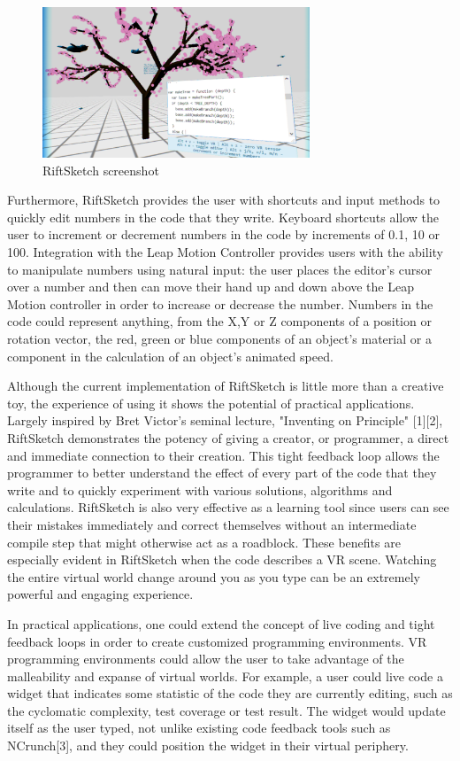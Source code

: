 \documentclass{acm_proc_article-sp}
\begin{document}
\begin{figure}[ht!]
\centering
\includegraphics[width=80mm]{figures/riftsketch/closer}
\caption{RiftSketch screenshot \label{riftsketch}}
\end{figure}

Furthermore, RiftSketch provides the user with shortcuts and input methods to quickly edit numbers in the code that they write. Keyboard shortcuts allow the user to increment or decrement numbers in the code by increments of 0.1, 10 or 100. Integration with the Leap Motion Controller provides users with the ability to manipulate numbers using natural input: the user places the editor's cursor over a number and then can move their hand up and down above the Leap Motion controller in order to increase or decrease the number. Numbers in the code could represent anything, from the X,Y or Z components of a position or rotation vector, the red, green or blue components of an object's material or a component in the calculation of an object's animated speed.

Although the current implementation of RiftSketch is little more than a creative toy, the experience of using it shows the potential of practical applications. Largely inspired by Bret Victor's seminal lecture, "Inventing on Principle" [1][2], RiftSketch demonstrates the potency of giving a creator, or programmer, a direct and immediate connection to their creation. This tight feedback loop allows the programmer to better understand the effect of every part of the code that they write and to quickly experiment with various solutions, algorithms and calculations. RiftSketch is also very effective as a learning tool since users can see their mistakes immediately and correct themselves without an intermediate compile step that might otherwise act as a roadblock.  These benefits are especially evident in RiftSketch when the code describes a VR scene. Watching the entire virtual world change around you as you type can be an extremely powerful and engaging experience.

In practical applications, one could extend the concept of live coding and tight feedback loops in order to create customized programming environments. VR programming environments could allow the user to take advantage of the malleability and expanse of virtual worlds. For example, a user could live code a widget that indicates some statistic of the code they are currently editing, such as the cyclomatic complexity, test coverage or test result. The widget would update itself as the user typed, not unlike existing code feedback tools such as NCrunch[3], and they could position the widget in their virtual periphery.
\end{document}
